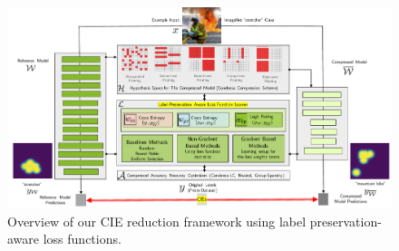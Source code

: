 \begin{figure}[!t]
\centering
  \includegraphics[width=\textwidth]{img/FinalIntroFigure.pdf}
  \caption{Overview of our CIE reduction framework using label preservation-aware loss functions.}
  \label{fig:overview}
\end{figure}

